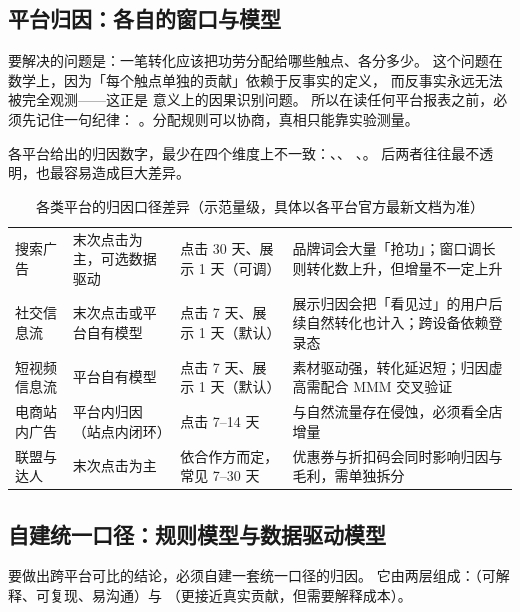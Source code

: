 \subsection{平台归因：各自的窗口与模型}

 要解决的问题是：一笔转化应该把功劳分配给哪些触点、各分多少。
这个问题在数学上，因为「每个触点单独的贡献」依赖于反事实的定义，
而反事实永远无法被完全观测——这正是 \cite{pearl2009causality} 意义上的因果识别问题。
所以在读任何平台报表之前，必须先记住一句纪律：
。分配规则可以协商，真相只能靠实验测量。

各平台给出的归因数字，最少在四个维度上不一致：、、
、。
后两者往往最不透明，也最容易造成巨大差异。

\begin{table}[htbp]
\centering
\caption{各类平台的归因口径差异（示范量级，具体以各平台官方最新文档为准）}
\label{tab:growth-attrib-window}
\small
\begin{tabularx}{\textwidth}{L{2.0cm} L{2.9cm} L{3.0cm} Y}
\toprule
{} &  &  &  \\
\midrule
搜索广告 & 末次点击为主，可选数据驱动 & 点击 30 天、展示 1 天（可调） & 品牌词会大量「抢功」；窗口调长则转化数上升，但增量不一定上升 \\
\addlinespace
社交信息流 & 末次点击或平台自有模型 & 点击 7 天、展示 1 天（默认） & 展示归因会把「看见过」的用户后续自然转化也计入；跨设备依赖登录态 \\
\addlinespace
短视频信息流 & 平台自有模型 & 点击 7 天、展示 1 天（默认） & 素材驱动强，转化延迟短；归因虚高需配合 MMM 交叉验证 \\
\addlinespace
电商站内广告 & 平台内归因（站点内闭环） & 点击 7--14 天 & 与自然流量存在侵蚀，必须看全店增量 \\
\addlinespace
联盟与达人 & 末次点击为主 & 依合作方而定，常见 7--30 天 & 优惠券与折扣码会同时影响归因与毛利，需单独拆分 \\
\bottomrule
\end{tabularx}
\end{table}

\subsection{自建统一口径：规则模型与数据驱动模型}

要做出跨平台可比的结论，必须自建一套统一口径的归因。
它由两层组成：（可解释、可复现、易沟通）与
（更接近真实贡献，但需要解释成本）。

